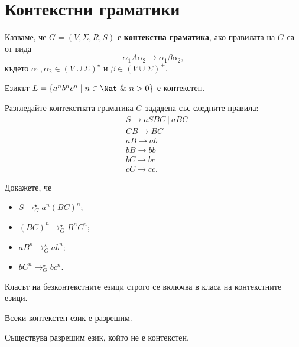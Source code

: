 \section{Контекстни граматики}

Казваме, че $G = (V,\Sigma,R,S)$ е {\bf контекстна граматика}, ако правилата на $G$ са от вида
\[\alpha_1 A \alpha_2 \to \alpha_1 \beta \alpha_2,\]
където $\alpha_1,\alpha_2 \in (V\cup\Sigma)^\star$ и $\beta \in (V\cup\Sigma)^+$.

\begin{problem}
  Езикът $L = \{a^nb^nc^n \mid n \in \Nat\ \&\ n > 0\}$ е контекстен.
\end{problem}
\begin{hint}
  Разгледайте контекстната граматика $G$ зададена със следните правила:
  \begin{align*}
    & S \to aSBC\ |\ aBC\\
    & CB \to BC\\
    & aB \to ab\\
    & bB \to bb\\
    & bC \to bc\\
    & cC \to cc.
  \end{align*}

  Докажете, че
  \begin{itemize}
  \item
    $S \to^\star_Ga^n(BC)^n$;
  \item
    $(BC)^n \to^\star_G B^nC^n$;
  \item
    $aB^n \to^\star_G ab^n$;
  \item
    $bC^n \to^\star_G bc^n$.
  \end{itemize}
\end{hint}

\begin{prop}
  Класът на безконтекстните езици строго се включва в класа на контекстните езици.
\end{prop}

\begin{prop}
  Всеки контекстен език е разрешим.
\end{prop}

\begin{prop}
  Съществува разрешим език, който не е контекстен.
\end{prop}


